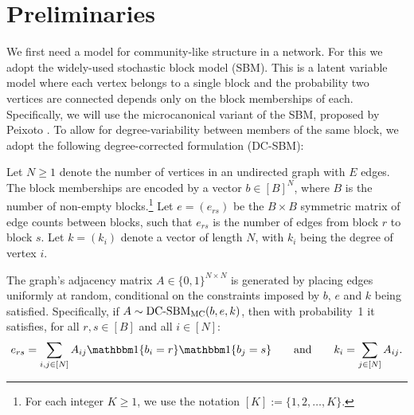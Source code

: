 \section{Preliminaries}

We first need a model for community-like structure in a network. For this we adopt the widely-used stochastic block model (SBM). This is a latent variable model where each vertex belongs to a single block and the probability two vertices are connected depends only on the block memberships of each.
Specifically, we will use the microcanonical variant of the SBM, proposed by Peixoto \cite{Peixoto-Bayesian-Microcanonical}. To allow for degree-variability between members of the same block, we adopt the following degree-corrected 
formulation (DC-SBM):

\begin{definition}
	\label{defn:microcan-dc-sbm}
	Let $N \geq 1$ denote the number of vertices in an undirected graph
with $E$ edges. The block memberships are encoded by a vector $b \in [B]^N$,
where $B$ is the number of non-empty blocks.\footnote{For each integer $K\geq 1$, we use the notation $[K]:=\{1,2,\ldots,K\}$.}
	Let $e=(e_{rs})$ be the $B \times B$ symmetric matrix of edge counts 
between blocks, such that $e_{rs}$ is the number of edges from block $r$ to 
block $s$. 
	Let $k =(k_i)$ denote a vector of length $N$, with $k_i$ being the degree of vertex $i$.

The graph's adjacency matrix $A \in \{0,1\}^{N \times N}$ is generated 
by placing edges uniformly at random, conditional
on the constraints imposed by $b$, $e$ and $k$ being satisfied.
Specifically, if $A \sim \mbox{\rm DC-SBM}_{\rm MC} (b, e, k)$,
then with probability~1 it satisfies,
for all $r,s\in[B]$
and all $i\in[N]$:
	\begin{equation}
		e_{rs} = \sum_{i, j \in [N]} A_{ij} 
	\one \{b_i = r\} \one \{b_j = s\} 
		\qquad 
		\textrm{and} \qquad
		k_i = \sum_{j \in [N]} A_{ij}.
		\label{eqn:sbm-constraints}
	\end{equation}
\end{definition}

